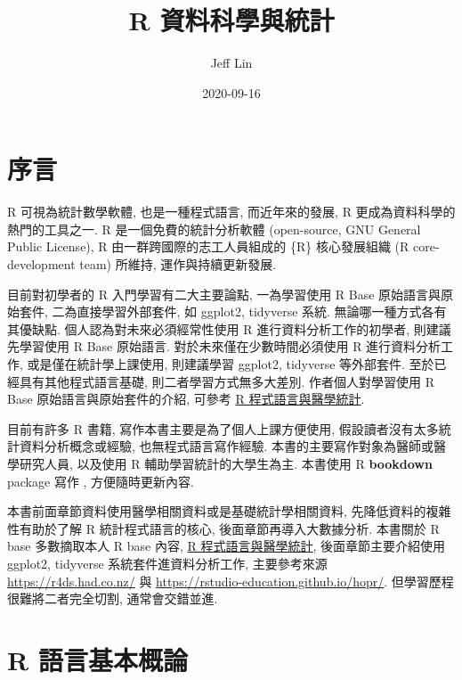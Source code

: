 \documentclass[
]{book}
\title{R 資料科學與統計}
\author{Jeff Lin}
\date{2020-09-16}
\begin{document}
\maketitle

{
\setcounter{tocdepth}{1}
\tableofcontents
}
\hypertarget{ux5e8fux8a00}{%
\chapter*{序言}\label{ux5e8fux8a00}}

R 可視為統計數學軟體, 也是一種程式語言,
而近年來的發展, R 更成為資料科學的熱門的工具之一.
R 是一個免費的統計分析軟體 (open-source, GNU General Public License),
R 由一群跨國際的志工人員組成的 \{R\} 核心發展組織 (R core-development team) 所維持, 運作與持續更新發展.

目前對初學者的 R 入門學習有二大主要論點,
一為學習使用 R Base 原始語言與原始套件,
二為直接學習外部套件, 如 ggplot2, tidyverse 系統.
無論哪一種方式各有其優缺點.
個人認為對未來必須經常性使用 R 進行資料分析工作的初學者,
則建議先學習使用 R Base 原始語言.
對於未來僅在少數時間必須使用 R 進行資料分析工作,
或是僅在統計學上課使用,
則建議學習 ggplot2, tidyverse 等外部套件.
至於已經具有其他程式語言基礎, 則二者學習方式無多大差別.
作者個人對學習使用 R Base 原始語言與原始套件的介紹, 可參考
\href{https://www.jefflinmd.com/book/rintro/}{R 程式語言與醫學統計}.

目前有許多 R 書籍, 寫作本書主要是為了個人上課方便使用,
假設讀者沒有太多統計資料分析概念或經驗,
也無程式語言寫作經驗.
本書的主要寫作對象為醫師或醫學研究人員,
以及使用 R 輔助學習統計的大學生為主.
本書使用 R \textbf{bookdown} package 寫作 \citep{R-bookdown}, 方便隨時更新內容.

本書前面章節資料使用醫學相關資料或是基礎統計學相關資料,
先降低資料的複雜性有助於了解 R 統計程式語言的核心,
後面章節再導入大數據分析.
本書關於 R base 多數摘取本人 R base 內容,
\href{https://www.jefflinmd.com/book/rintro/}{R 程式語言與醫學統計},
後面章節主要介紹使用 ggplot2, tidyverse 系統套件進資料分析工作,
主要參考來源 \url{https://r4ds.had.co.nz/} 與 \url{https://rstudio-education.github.io/hopr/}.
但學習歷程很難將二者完全切割,
通常會交錯並進.

\hypertarget{intro}{%
\chapter{R 語言基本概論}\label{intro}}
\end{document}

